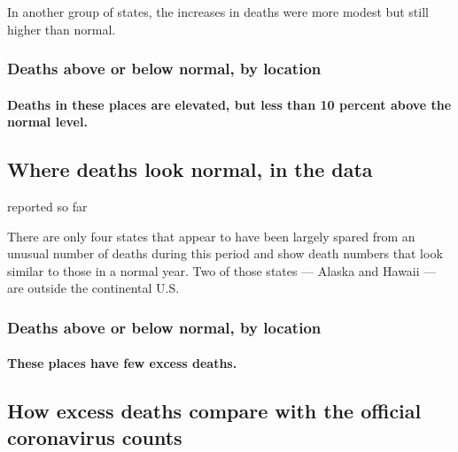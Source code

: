 In another group of states, the increases in deaths were more modest but
still higher than normal.

\hypertarget{deaths-above-or-below-normal-by-location-1}{%
\subsubsection{Deaths above or below normal, by
location}\label{deaths-above-or-below-normal-by-location-1}}

\hypertarget{deaths-in-these-places-are-elevated-but-less-than-10-percent-above-the-normal-level}{%
\paragraph{Deaths in these places are elevated, but less than 10 percent
above the normal
level.}\label{deaths-in-these-places-are-elevated-but-less-than-10-percent-above-the-normal-level}}

\hypertarget{where-deaths-look-normal-in-the-data}{%
\subsection{Where deaths look normal, in the
data}\label{where-deaths-look-normal-in-the-data}}

reported so far

There are only four states that appear to have been largely spared from
an unusual number of deaths during this period and show death numbers
that look similar to those in a normal year. Two of those states ---
Alaska and Hawaii --- are outside the continental U.S.

\hypertarget{deaths-above-or-below-normal-by-location-2}{%
\subsubsection{Deaths above or below normal, by
location}\label{deaths-above-or-below-normal-by-location-2}}

\hypertarget{these-places-have-few-excess-deaths}{%
\paragraph{These places have few excess
deaths.}\label{these-places-have-few-excess-deaths}}

\hypertarget{how-excess-deaths-compare-with-the-official-coronavirus-counts}{%
\subsection{How excess deaths compare with the official coronavirus
counts}\label{how-excess-deaths-compare-with-the-official-coronavirus-counts}}

